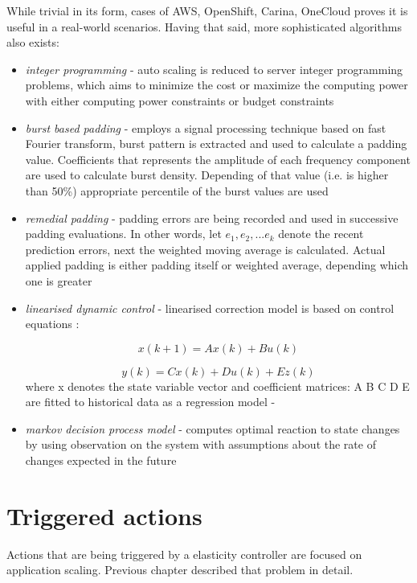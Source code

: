 While trivial in its form, cases of AWS, OpenShift, Carina, OneCloud proves it is useful in a real-world scenarios. Having that said, more sophisticated algorithms also exists:
\begin{itemize}
  \item \textit{integer programming} - auto scaling is reduced to server integer programming problems, which aims to minimize the cost or maximize the computing power with either computing power constraints or
budget constraints \cite{MaLiHu10}
  \item \textit{burst based padding} - employs a signal processing technique based on fast Fourier transform, burst pattern is extracted and used to calculate a padding value. Coefficients that represents the amplitude of each frequency component are used to calculate burst density. Depending of that value (i.e. is higher than 50\%) appropriate percentile of the burst values are used \cite{ShSuGuWi11}  
  \item \textit{remedial padding} - padding errors are being recorded and used in successive padding evaluations. In other words, let $e_1, e_2, ... e_k$ denote the recent prediction errors, next the weighted moving average is calculated. Actual applied padding is either padding itself or weighted average, depending which one is greater \cite{ShSuGuWi11}    
  \item \textit{linearised dynamic control} - linearised correction model is based on control equations \cite{AbShBh02}:
  
    \begin{equation}
      x(k+1)=Ax(k)+Bu(k)
    \end{equation}
    
    \begin{equation}
       y(k) = C x(k) + D u(k) + E z(k)
    \end{equation}
    where x denotes the state variable vector and coefficient matrices: A B C D E are fitted to historical data as a regression model - \cite{DiLuFrHePa03}

  \item \textit{markov decision process model} - computes optimal reaction to state changes by using observation on the system with assumptions about the rate of changes expected in the future \cite{AbWo02}
\end{itemize}

\section{Triggered actions}
Actions that are being triggered by a elasticity controller are focused on application scaling. Previous chapter described that problem in detail.

